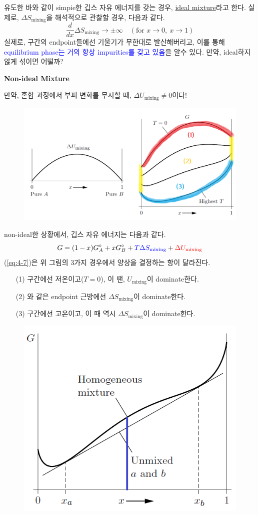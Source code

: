 \documentclass{article}
\begin{document}
유도한 바와 같이 simpie한 깁스 자유 에너지를 갖는 경우, \underline{ideal mixture}라고 한다. 실제로, $\Delta S_{\text{mixing}}$을 해석적으로 관찰할 경우, 다음과 같다.
\begin{equation}
    \frac{d}{dx} \Delta S_{\text{mixing}} \rightarrow \pm \infty \quad (\text{for }x \rightarrow 0, \ x \rightarrow 1)
\end{equation}
실제로, 구간의 endpoint들에선 기울기가 무한대로 발산해버리고, 이를 통해 \textcolor{blue}{equilibrium phase는 거의 항상 impurities를 갖고 있음}을 알수 있다. 만약, ideal하지 않게 섞이면 어떨까?

\newpage

\noindent
\textbf{Non-ideal Mixture}

만약, 혼합 과정에서 부피 변화를 무시할 때, $\Delta U_{\text{mixing}} \neq 0$이다!

\begin{figure}[h]
    \centering
    \includegraphics[width=0.7\linewidth]{images/fig4_3.png}
\end{figure}

\noindent
non-ideal한 상황에서, 깁스 자유 에너지는 다음과 같다.
\begin{equation}\label{eq:4-7}
    G = (1-x) G_A^\circ + xG_B^\circ + \color{blue} T \Delta S_{\text{mixing}} \color{black} + \color{red} \Delta U_{\text{mixing}} \color{black}
\end{equation}
(\ref{eq:4-7})은 위 그림의 3가지 경우에서 양상을 결정하는 항이 달라진다.
\begin{enumerate}
    \item[(1)] 구간에선 저온이고($T=0$), 이 땐, $U_{\text{mixing}}$이 dominate한다.
    \item[(2)] 와 같은 endpoint 근방에선 $\Delta S_{\text{mixing}}$이 dominate한다.
    \item[(3)] 구간에선 고온이고, 이 때 역시 $\Delta S_{\text{mixing}}$이 dominate한다.
\end{enumerate}

\begin{figure}[h]
    \centering
    \includegraphics[width=0.4\linewidth]{images/fig4_4.png}
\end{figure}
\end{document}

